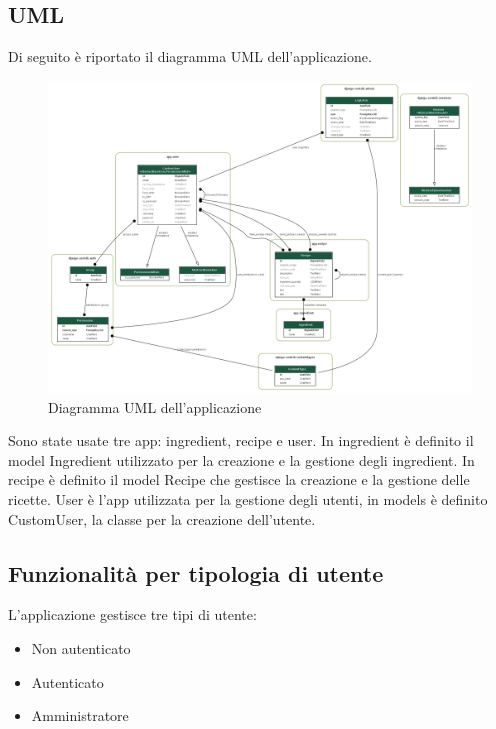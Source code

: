 \documentclass[a4paper]{article}
\begin{document}
        
        \subsection{UML}
            Di seguito è riportato il diagramma UML dell'applicazione.
            
            \begin{figure}[ht]
                \centering
                \includegraphics[width=1\textwidth]{./pictures/uml.png}
                \caption{Diagramma UML dell'applicazione}
                \label{fig:uml}
            \end{figure}
            
            Sono state usate tre app: ingredient, recipe e user.
            In ingredient è definito il model Ingredient utilizzato per la creazione e la gestione degli ingredient.
            In recipe è definito il model Recipe che gestisce la creazione e la gestione delle ricette.
            User è l'app utilizzata per la gestione degli utenti, in models è definito CustomUser, 
            la classe per la creazione dell'utente.
        
        
        \subsection{Funzionalità per tipologia di utente}
            L'applicazione gestisce tre tipi di utente:
            
            \begin{itemize}
                \item Non autenticato
                \item Autenticato
                \item Amministratore
            \end{itemize}
            
\end{document}
